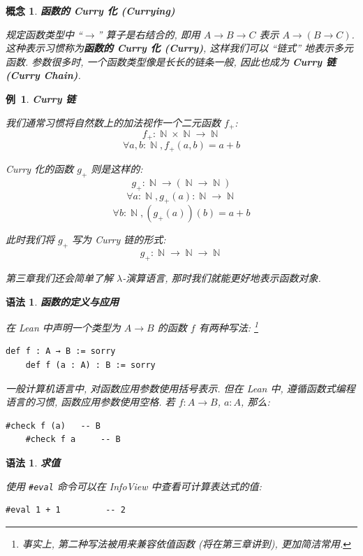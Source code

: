 \documentclass[UTF8]{ctexart}
\DeclareMathOperator{\N}{\mathbb{N}}                    %
\DeclareMathOperator{\0}{\mathbf{0}}                    %
\newcommand{\<}{\langle}
\renewcommand{\>}{\rangle}                              %
\newenvironment{dfn_box}{
    \begin{tcolorbox}[enhanced, colback=dfn_green2, boxrule=0pt, frame hidden,
        borderline west={0.7mm}{0.1mm}{dfn_green1},breakable]
    }
    {\end{tcolorbox}}
\newenvironment{thm_box}{
    \begin{tcolorbox}[enhanced, colback=thm_blue2, boxrule=0pt, frame hidden,
        borderline west={0.7mm}{0.1mm}{thm_blue1},breakable]
    }
    {\end{tcolorbox}}
\newenvironment{xmp_box}{
    \begin{tcolorbox}[enhanced, colback=xmp_purple2, boxrule=0pt, frame hidden,
        borderline west={0.7mm}{0.1mm}{xmp_purple1},breakable]
    }
    {\end{tcolorbox}}
\theoremstyle{MyStyle} %
\newtheorem{concept}[definition]{概念}
\newenvironment{cpt}[1]
{
    \begin{dfn_box}
        \begin{concept}
            \textbf{#1}
            \newline
}
{
        \end{concept}
    \end{dfn_box}
}
\newtheorem{syntax}[definition]{语法}
\newenvironment{syn}[1]
{
    \begin{thm_box}
        \begin{syntax}
            \textbf{#1}
            \newline
}
{
        \end{syntax}
    \end{thm_box}
}
\newtheorem{example}{ 例\, }[subsection]
\newenvironment{xmp}[1]
{
    \begin{xmp_box}
        \begin{example}
            \textbf{#1}
            \newline
}
{
        \end{example}
    \end{xmp_box}
}
\newcommand*{\lean}[1]{\texttt{\color{blue}#1}}
\begin{document}
        \begin{cpt}
            {函数的 Curry 化 (Currying)}
            规定函数类型中 ``$\to$'' 算子是右结合的, 即用 $A\to B\to C$ 表示 $A\to (B\to C)$. 这种表示习惯称为\textbf{函数的 Curry 化 (Curry)}, 这样我们可以 ``链式'' 地表示多元函数. 参数很多时, 一个函数类型像是长长的链条一般, 因此也成为 \textbf{Curry 链 (Curry Chain)}. 
        \end{cpt}

        \begin{xmp}
            {Curry 链}
            我们通常习惯将自然数上的加法视作一个二元函数 $f_+$: 
            \[f_+ : \N\times\N\to\N\]
            \[\forall a, b:\N, f_+(a,b) = a + b\]

            Curry 化的函数 $g_+$ 则是这样的: 
            \[g_+ : \N\to(\N\to\N)\]
            \[\forall a : \N, g_+(a) : \N\to\N\]
            \[\forall b : \N, (g_+(a))(b) = a + b\]

            此时我们将 $g_+$ 写为 Curry 链的形式: 
            \[g_+ : \N\to\N\to\N\]

            第三章我们还会简单了解 $\lambda$-演算语言, 那时我们就能更好地表示函数对象. 
        \end{xmp}

        \begin{syn}
            {函数的定义与应用}
            在 Lean 中声明一个类型为 $A\to B$ 的函数 $f$ 有两种写法: \footnote{事实上, 第二种写法被用来兼容依值函数 (将在第三章讲到), 更加简洁常用. }
            \begin{lstlisting}[style=lean]
    def f : A → B := sorry
    def f (a : A) : B := sorry
            \end{lstlisting}

            一般计算机语言中, 对函数应用参数使用括号表示. 但在 Lean 中, 遵循函数式编程语言的习惯, 函数应用参数使用空格. 若 $f : A\to B$, $a : A$, 那么: 
            \begin{lstlisting}[style=lean]
    #check f (a)   -- B
    #check f a     -- B
            \end{lstlisting}
        \end{syn}

        \begin{syn}
            {求值}
            使用 \lean{\#eval} 命令可以在 InfoView 中查看可计算表达式的值: 
            \begin{lstlisting}[style=lean]
    #eval 1 + 1         -- 2
            \end{lstlisting}
        \end{syn}
\end{document}
